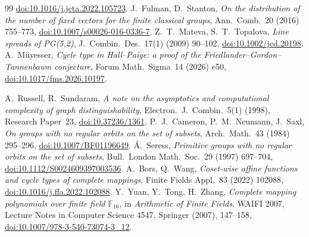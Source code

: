\documentclass[11pt]{article}
\begin{document}
\begin{thebibliography}{99}
\href{https://doi.org/10.1016/j.jcta.2022.105723}{doi:10.1016/j.jcta.2022.105723}.
 J.~Fulman, D.~Stanton, \emph{On the distribution of the number of fixed vectors for the finite classical groups},
Ann.~Comb.~20 (2016) 755--773,
\href{https://doi.org/10.1007/s00026-016-0336-7}{doi:10.1007/s00026-016-0336-7}.
 Z.~T.~Mateva, S.~T.~Topalova, \emph{Line spreads of PG(5,2)},
J.~Combin.~Des.~17(1) (2009) 90--102,
\href{https://doi.org/10.1002/jcd.20198}{doi:10.1002/jcd.20198}.
 A.~M\"uyesser,
\emph{Cycle type in Hall--Paige: a proof of the Friedlander--Gordon--Tannenbaum conjecture},
Forum Math.~Sigma~14 (2026) e50,
\href{https://doi.org/10.1017/fms.2026.10197}{doi:10.1017/fms.2026.10197}.

 A.~Russell, R.~Sundaram,
\emph{A note on the asymptotics and computational complexity of graph
distinguishability}, Electron.~J.~Combin.~5(1) (1998), Research Paper~23,
\href{https://doi.org/10.37236/1361}{doi:10.37236/1361}.
 P.~J.~Cameron, P.~M.~Neumann, J.~Saxl,
\emph{On groups with no regular orbits on the set of subsets},
Arch.~Math.~43 (1984) 295--296,
\href{https://doi.org/10.1007/BF01196649}{doi:10.1007/BF01196649}.
 \'{A}.~Seress,
\emph{Primitive groups with no regular orbits on the set of subsets},
Bull.~London Math.~Soc.~29 (1997) 697--704,
\href{https://doi.org/10.1112/S0024609397003536}{doi:10.1112/S0024609397003536}.
 A.~Bors, Q.~Wang,
\emph{Coset-wise affine functions and cycle types of complete mappings},
Finite Fields Appl.~83 (2022) 102088,
\href{https://doi.org/10.1016/j.ffa.2022.102088}{doi:10.1016/j.ffa.2022.102088}.
 Y.~Yuan, Y.~Tong, H.~Zhang,
\emph{Complete mapping polynomials over finite field $\mathbb F_{16}$},
in \emph{Arithmetic of Finite Fields}, WAIFI 2007, Lecture Notes in Computer
Science 4547, Springer (2007), 147--158,
\href{https://doi.org/10.1007/978-3-540-73074-3_12}{doi:10.1007/978-3-540-73074-3\_12}.
\end{thebibliography}

\appendix
\end{document}
